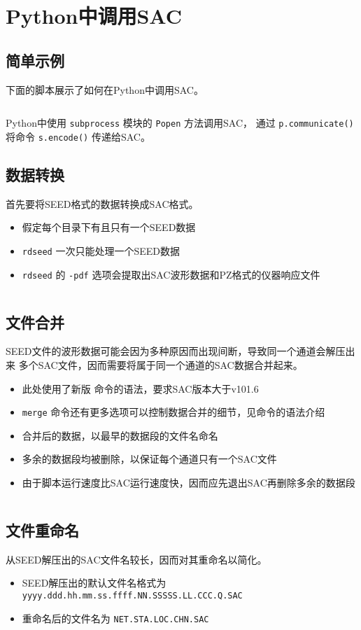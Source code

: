 \section{Python中调用SAC}
\label{sec:sac-python}

\subsection{简单示例}
下面的脚本展示了如何在Python中调用SAC。
\inputminted{python}{./call-in-script/0.simple-script.py}
Python中使用 \texttt{subprocess} 模块的 \texttt{Popen} 方法调用SAC，
通过 \texttt{p.communicate()} 将命令 \texttt{s.encode()} 传递给SAC。

\subsection{数据转换}
首先要将SEED格式的数据转换成SAC格式。
\begin{itemize}
\item 假定每个目录下有且只有一个SEED数据
\item \texttt{rdseed} 一次只能处理一个SEED数据
\item \texttt{rdseed} 的 \texttt{-pdf} 选项会提取出SAC波形数据和PZ格式的仪器响应文件
\end{itemize}
\inputminted{python}{./call-in-script/1.rdseed.py}

\subsection{文件合并}
\label{subsec:merge-in-python}
SEED文件的波形数据可能会因为多种原因而出现间断，导致同一个通道会解压出来
多个SAC文件，因而需要将属于同一个通道的SAC数据合并起来。
\begin{itemize}
\item 此处使用了新版  命令的语法，要求SAC版本大于v101.6
\item \texttt{merge} 命令还有更多选项可以控制数据合并的细节，见命令的语法介绍
\item 合并后的数据，以最早的数据段的文件名命名
\item 多余的数据段均被删除，以保证每个通道只有一个SAC文件
\item 由于脚本运行速度比SAC运行速度快，因而应先退出SAC再删除多余的数据段
\end{itemize}
\inputminted{python}{./call-in-script/2.merge.py}

\subsection{文件重命名}
\label{subsec:rename-in-python}
从SEED解压出的SAC文件名较长，因而对其重命名以简化。
\begin{itemize}
\item SEED解压出的默认文件名格式为 \texttt{yyyy.ddd.hh.mm.ss.ffff.NN.SSSSS.LL.CCC.Q.SAC}
\item 重命名后的文件名为 \texttt{NET.STA.LOC.CHN.SAC}
\end{itemize}
\inputminted{python}{./call-in-script/3.rename.py}

